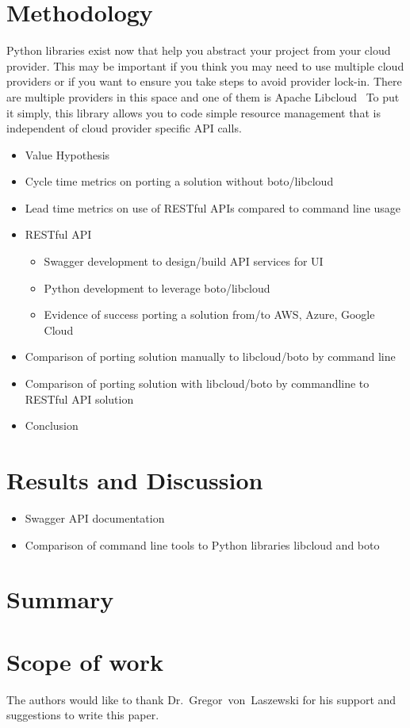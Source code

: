\section{Methodology}

Python libraries exist now that help you abstract your project from  your cloud provider. 
This may be important if you think you may need to use multiple cloud providers or if you 
want to ensure you take steps to avoid provider lock-in. There are multiple providers in 
this space and one of them is Apache Libcloud~\cite{hid-sp18-518-LibCloud} To put it 
simply, this library allows you to code simple resource  management that is independent 
of cloud provider specific API calls.

\begin{itemize}
\item
  Value Hypothesis
\item
  Cycle time metrics on porting a solution without boto/libcloud
\item
  Lead time metrics on use of RESTful APIs compared to command line
  usage
\item
  RESTful API

  \begin{itemize}
    \item
    Swagger development to design/build API services for UI
  \item
    Python development to leverage boto/libcloud
  \item
    Evidence of success porting a solution from/to AWS, Azure, Google
    Cloud
  \end{itemize}
\item
  Comparison of porting solution manually to libcloud/boto by command
  line
\item
  Comparison of porting solution with libcloud/boto by commandline to
  RESTful API solution
\item
  Conclusion
\end{itemize}

\section{Results and Discussion}

\begin{itemize}
\item
  Swagger API documentation
\item
  Comparison of command line tools to Python libraries libcloud and boto
\end{itemize}

\section{Summary}

\section{Scope of work}\label{scope-of-work}

\begin{acks}

  The authors would like to thank Dr.~Gregor~von~Laszewski for his
  support and suggestions to write this paper.

\end{acks}


 

